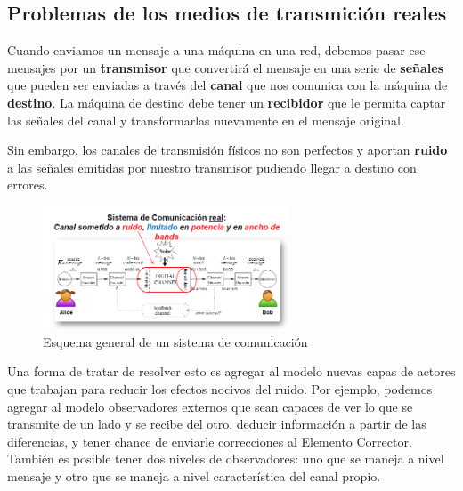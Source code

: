 \subsection{Problemas de los medios de transmición reales}
Cuando enviamos un mensaje a una máquina en una red, debemos pasar ese mensajes por un \textbf{transmisor} que convertirá el mensaje en una serie de \textbf{señales} que pueden ser enviadas a través del \textbf{canal} que nos comunica con la máquina de \textbf{destino}. La máquina de destino debe tener un \textbf{recibidor} que le permita captar las señales del canal y transformarlas nuevamente en el mensaje original.

Sin embargo, los canales de transmisión físicos no son perfectos y aportan \textbf{ruido} a las señales emitidas por nuestro transmisor pudiendo llegar a destino con errores.

\begin{figure}[H]
	\centering
	\includegraphics[width=0.65\textwidth
]{images/sistema-comunicacion-real.png}
	\caption[Esquema general de un sistema de comunicación]{Esquema general de un sistema de comunicación}
	\label{fig:sistema-comunicacion-correccion}
\end{figure}

Una forma de tratar de resolver esto es agregar al modelo nuevas capas de actores que trabajan para reducir los efectos nocivos del ruido. Por ejemplo, podemos agregar al modelo observadores externos que sean capaces de ver lo que se transmite de un lado y se recibe del otro, deducir información a partir de las diferencias, y tener chance de enviarle
correcciones al Elemento Corrector. También es posible tener dos niveles de observadores:
uno que se maneja a nivel mensaje y otro que se maneja a nivel característica del canal
propio.

